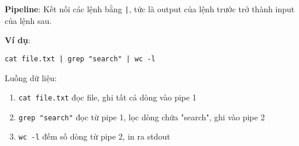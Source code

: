 \textbf{Pipeline}: Kết nối các lệnh bằng \texttt{|}, tức là output của lệnh trước 
trở thành input của lệnh sau.

\textbf{Ví dụ}:
\begin{verbatim}
cat file.txt | grep "search" | wc -l
\end{verbatim}

Luồng dữ liệu:
\begin{enumerate}[leftmargin=1.5cm]
  \item \texttt{cat file.txt} đọc file, ghi tất cả dòng vào pipe 1
  \item \texttt{grep "search"} đọc từ pipe 1, lọc dòng chứa "search", ghi vào pipe 2
  \item \texttt{wc -l} đếm số dòng từ pipe 2, in ra stdout
\end{enumerate}

\clearpage
